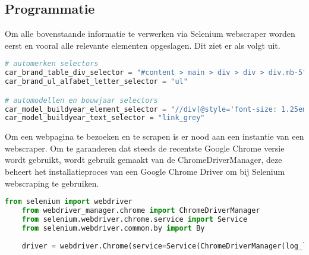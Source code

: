 \subsection{Programmatie}
Om alle bovenstaande informatie te verwerken via Selenium webscraper worden eerst en vooral alle relevante elementen opgeslagen.
Dit ziet er als volgt uit.
\begin{lstlisting}[language=Python, caption=Python houdt constanten bij van alle css selectors om elementen te vinden op de webpagina's, label={lst:selectors}, breaklines=true, showstringspaces=false]
# automerken selectors
car_brand_table_div_selector = "#content > main > div > div > div.mb-5"
car_brand_ul_alfabet_letter_selector = "ul"

# automodellen en bouwjaar selectors
car_model_buildyear_element_selector = "//div[@style='font-size: 1.25em; margin: 10px !important;']"
car_model_buildyear_text_selector = "link_grey"
\end{lstlisting}

Om een webpagina te bezoeken en te scrapen is er nood aan een instantie van een webscraper. Om te garanderen dat steeds de recentste Google Chrome versie wordt gebruikt, wordt gebruik gemaakt van de ChromeDriverManager, deze beheert het installatieproces van een Google Chrome Driver om bij Selenium webscraping te gebruiken. 
\begin{lstlisting}[language=Python, caption=Python declaratie en initialisatie Selenium webscraper, breaklines=true, showstringspaces=false]
	from selenium import webdriver
	from webdriver_manager.chrome import ChromeDriverManager
	from selenium.webdriver.chrome.service import Service
	from selenium.webdriver.common.by import By
	
	driver = webdriver.Chrome(service=Service(ChromeDriverManager(log_level=0).install()))
\end{lstlisting}

